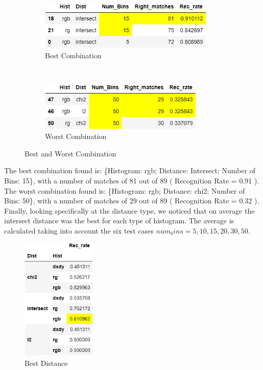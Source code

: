 \documentclass[
	12pt, %
]{fphw}
\begin{document}
\begin{figure}[h!]
    \centering
    \begin{subfigure}[t]{0.5\textwidth}
        \centering
        \includegraphics[height=0.9in]{img/best_combination.png}
         \caption{Best Combination}
    \end{subfigure}%
    ~ 
    \begin{subfigure}[t]{0.5\textwidth}
        \centering
        \includegraphics[height=0.9in]{img/worst_combination.png}
         \caption{Worst Combination}
	\end{subfigure}
	\caption{Best and Worst Combination}
\end{figure}


The best combination found is: \{Histogram: rgb; Distance: Intersect; Number of Bins: 15\}, with a number of matches of 81 out of 89 ( Recognition Rate = 0.91 ).\\ 

The worst combination found is: \{Histogram: rgb; Distance: chi2; Number of Bins: 50\}, with a number of matches of 29 out of 89 ( Recognition Rate = 0.32 ).\\

Finally, looking specifically at the distance type, we noticed that on average the intersect distance was the best for each type of histogram.
The average is calculated taking into account the six test cases \(num_bins = 5, 10, 15, 20, 30, 50\).

\begin{figure}[h!]
    \centering
    \includegraphics[height=2.3in]{img/best_dist.png}
     \caption{Best Distance}
\end{figure}
\end{document}
